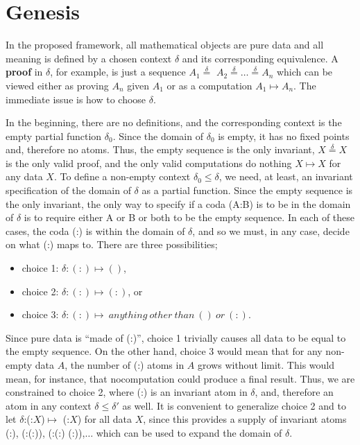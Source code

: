 \documentclass[11pt]{article}
\begin{document}
\section{Genesis}

    In the proposed framework, all mathematical objects are pure data and all meaning is defined by a chosen context $\delta$ and its corresponding equivalence.  
A {\bf proof} in $\delta$, for example, is just a sequence $A_1{\overset \delta =}$ $A_2 {\overset \delta =} \dots {\overset \delta =}$$A_n$ which can be viewed either as proving $A_n$ 
given $A_1$ or as a computation $A_1\mapsto A_n$. 
The immediate issue is how to choose $\delta$.  
    
     In the beginning, there are no definitions, and the corresponding context is the empty partial function $\delta_0$.  
Since the domain of $\delta_0$ is empty, it has no fixed points and, therefore no atoms.  Thus, the empty sequence is the only invariant, 
$X{\overset \delta =}X$ is the only valid proof, and the only valid 
 computations do nothing $X\mapsto X$ for any data $X$.
To define a non-empty context $\delta_0\le\delta$, we need, at least, an invariant specification of the domain of $\delta$ as a partial function.    
Since the empty sequence is the only invariant, the only way to specify if a coda (A:B) is to be in the domain of $\delta$ is 
to require either A or B or both to be the empty sequence. In each of these cases, the coda (:) is within the domain of $\delta$, and so we must, in any case, 
decide on what (:) maps to.  There are three possibilities; 
\begin{itemize}
\item[] choice 1: {$\delta: (:) \mapsto ()$},
\item[] choice 2: {$\delta: (:) \mapsto (:)$}, or 
\item[] choice 3: {$\delta: (:) \mapsto \ anything\ other\ than\ ()\ or\ (:)$}. 
\end{itemize}
Since pure data is ``made of (:)'', choice 1 trivially causes all data to be equal to the empty sequence. 
On the other hand, choice 3 would mean that for any non-empty data $A$, the number of (:) atoms in $A$ grows without limit.  This would mean, for instance, 
that nocomputation could produce a final result.  Thus, we are constrained to choice 2, where (:) is an invariant atom in $\delta$, and, therefore an atom in 
any context $\delta\leq\delta'$ as well.  It is convenient to generalize choice 2 and to let $\delta$:(:$X$)$\mapsto$ (:$X$) for all data $X$, since this provides a 
supply of invariant atoms (:), (:(:)), (:(:) (:)),$\dots$ which can be used to expand the domain of $\delta$.  
\end{document}
